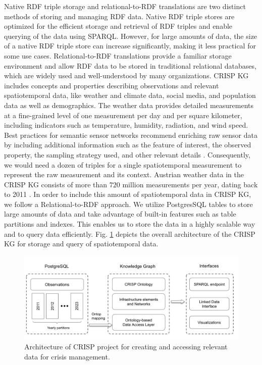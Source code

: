 \documentclass[
]{ceurart}
\begin{document}
Native RDF triple storage and relational-to-RDF translations are two distinct methods of storing and managing RDF data. Native RDF triple stores are optimized for the efficient storage and retrieval of RDF triples and enable querying of the data using SPARQL. However, for large amounts of data, the size of a native RDF triple store can increase significantly, making it less practical for some use cases. Relational-to-RDF translations provide a familiar storage environment and allow RDF data to be stored in traditional relational databases, which are widely used and well-understood by many organizations. CRISP KG includes concepts and properties describing observations and relevant spatiotemporal data, like weather and climate data, social media, and population data as well as demographics. The weather data provides detailed measurements at a fine-grained level of one measurement per day and per square kilometer, including indicators such as temperature, humidity, radiation, and wind speed. Best practices for semantic sensor networks recommend enriching raw sensor data by including additional information such as the feature of interest, the observed property, the sampling strategy used, and other relevant details \cite{janowicz2019sosa}. Consequently, we would need a dozen of triples for a single spatiotemporal measurement to represent the raw measurement and its context. Austrian weather data in the CRISP KG consists of more than $720$ million measurements per year,  dating back to 2011 \cite{haiden2011integrated}. In order to include this amount of spatiotemporal data in CRISP KG, we follow a Relational-to-RDF approach. We utilize PostgresSQL tables to store large amounts of data and take advantage of built-in features such as table partitions and indexes. This enables us to store the data in a highly scalable way and to query data efficiently. Fig. \ref{crisp_architecture} depicts the overall architecture of the CRISP KG for storage and query of spatiotemporal data.  


\begin{figure}
  \centering
  \includegraphics[scale=0.3]{images/CRISP_architecture.png}
  \caption{Architecture of CRISP project for creating and accessing relevant data for crisis management.}
  \label{crisp_architecture}
\end{figure}
\end{document}
